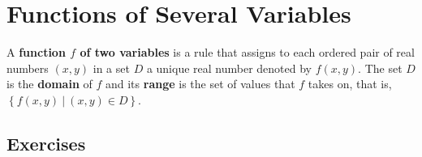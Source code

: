 \section{Functions of Several Variables}
\begin{definition}
	\label{definition-14.1.1}
	A \textbf{function $f$ of two variables} is a rule that assigns to each ordered pair of real numbers $\left( x, y \right)$ in a set $D$ a unique real number denoted by $f\left(x, y\right)$. The set $D$ is the \textbf{domain} of $f$ and its \textbf{range} is the set of values that $f$ takes on, that is, $\left\lbrace f\left(x, y\right) \: | \: \left( x, y \right) \in D \right\rbrace$.
\end{definition}

\subsection{Exercises}




\setcounter{exercise}{78}

